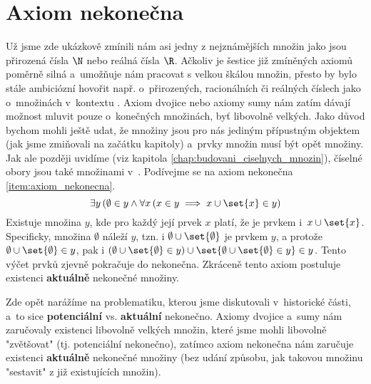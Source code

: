 \section{Axiom nekonečna}\label{sec:axiom_nekonecna}
Už jsme zde ukázkově zmínili nám asi jedny z nejznámějších množin jako jsou přirozená čísla $\N$ nebo reálná čísla $\R$. Ačkoliv je šestice již zmíněných axiomů poměrně silná a~umožňuje nám pracovat s velkou škálou množin, přesto by bylo stále ambiciózní hovořit např. o~přirozených, racionálních či reálných číslech jako o~množinách v~kontextu \ZF{}. Axiom dvojice nebo axiomy sumy nám zatím dávají možnost mluvit pouze o~konečných množinách, byť libovolně velkých. Jako důvod bychom mohli ještě udat, že množiny jsou pro nás jediným přípustným objektem (jak jsme zmiňovali na začátku kapitoly) a~prvky množin musí být opět množiny. Jak ale později uvidíme (viz kapitola \ref{chap:budovani_ciselnych_mnozin}), číselné obory jsou také množinami v~\ZF{}. Podívejme se na axiom nekonečna \ref{item:axiom_nekonecna}.
\begin{equation*}
    \exists y\, (\emptyset\in y \land \forall x\,(x\in y\implies x\cup\set{x}\in y)
\end{equation*}
Existuje množina $y$, kde pro každý její prvek $x$ platí, že je prvkem i~$x\cup\set{x}$. Specificky, množina $\emptyset$ náleží $y$, tzn. i $\emptyset\cup\set{\emptyset}$ je prvkem $y$, a protože $\emptyset\cup\set{\emptyset}\in y$, pak i $(\emptyset\cup\set{\emptyset}\in y)\cup\set{\emptyset\cup\set{\emptyset}\in y}\in y$. Tento výčet prvků zjevně pokračuje do nekonečna. Zkráceně tento axiom postuluje existenci \textbf{aktuálně} nekonečné množiny.\par
Zde opět narážíme na problematiku, kterou jsme diskutovali v~historické části, a~to sice \textbf{potenciální} vs. \textbf{aktuální} nekonečno. Axiomy dvojice a~sumy nám zaručovaly existenci libovolně velkých množin, které jsme mohli libovolně "zvětšovat" (tj. potenciální nekonečno), zatímco axiom nekonečna nám zaručuje existenci \textbf{aktuálně} nekonečné množiny (bez udání způsobu, jak takovou množinu "sestavit" z již existujících množin).\par